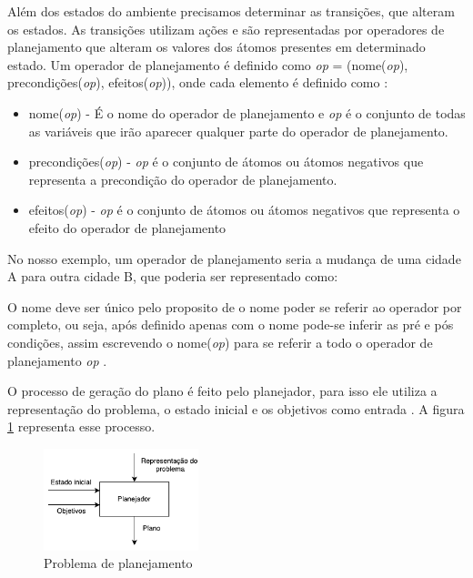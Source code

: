 Além dos estados do ambiente precisamos determinar as transições, que alteram os estados. As transições utilizam ações e são representadas por operadores de planejamento que alteram os valores dos átomos presentes em determinado estado. Um operador de planejamento é definido como \textit{op} = (nome(\textit{op}), precondições(\textit{op}), efeitos(\textit{op})), onde cada elemento é definido como \cite{ghallab2004automated}: 

\begin{itemize}
	\item nome(\textit{op}) - É o nome do operador de planejamento e \textit{op} é o conjunto de todas as variáveis que irão aparecer qualquer parte do operador de planejamento.  
	\item precondições(\textit{op}) - \textit{op} é o conjunto de átomos ou átomos negativos que representa a precondição do operador de planejamento. 
	\item efeitos(\textit{op}) - \textit{op} é o conjunto de átomos ou átomos negativos que representa o efeito do operador de planejamento
\end{itemize}

No nosso exemplo, um operador de planejamento seria a mudança de uma cidade A para outra cidade B, que poderia ser representado como:

O nome deve ser único pelo proposito de o nome poder se referir ao operador por completo, ou seja, após definido apenas com o nome pode-se inferir as pré e pós condições, assim escrevendo o nome(\textit{op}) para se referir a todo o operador de planejamento \textit{op} \cite{ghallab2004automated}. 

O processo de geração do plano é feito pelo planejador, para isso ele utiliza a representação do problema, o estado inicial e os objetivos como entrada \cite{ghallab2004automated}. A figura \ref{fig:planmodelo} representa esse processo. 

\begin{figure}[ht]
	\centering
	\includegraphics[width=0.4\textwidth]{fig/modelo.pdf}
	\caption{Problema de planejamento}
	\label{fig:planmodelo}
\end{figure} 

